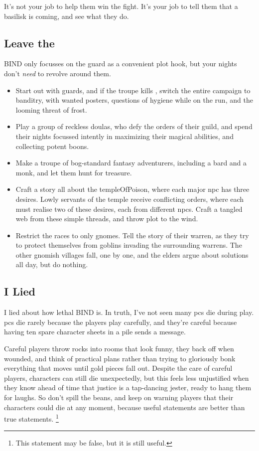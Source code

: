 \begin{multicols}{2}
It's not your job to help them win the fight.
It's your job to tell them that a basilisk is coming, and see what they do.

\subsection{Leave the }
BIND only focusses on the \gls{guard} as a convenient plot hook, but your nights don't \emph{need} to revolve around them.

\begin{itemize}
  \item
  Start out with \glspl{guard}, and if the troupe kills , switch the entire \gls{campaign} to banditry, with wanted posters, questions of hygiene while on the run, and the looming threat of frost.
  \item
  Play a group of reckless \glspl{doula}, who defy the orders of their guild, and spend their nights focussed intently in maximizing their magical abilities, and collecting potent \glspl{boon}.
  \item
  Make a troupe of bog-standard fantasy adventurers, including a bard and a monk, and let them hunt for treasure.
  \item
  Craft a story all about the \gls{templeOfPoison}, where each major \gls{npc} has three desires.
  Lowly servants of the temple receive conflicting orders, where each must realise two of these desires, each from different \glspl{npc}.
  Craft a tangled web from these simple threads, and throw plot to the wind.
  \item
  Restrict the races to only gnomes.
  Tell the story of their warren, as they try to protect themselves from goblins invading the surrounding warrens.
  The other gnomish villages fall, one by one, and the elders argue about solutions all day, but do nothing.
\end{itemize}

\subsection{I Lied}
I lied about how lethal BIND is.
In truth, I've not seen many \glspl{pc} die during play.
\Glspl{pc} die rarely because the players play carefully, and they're careful because having ten spare character sheets in a pile sends a message.

Careful players throw rocks into rooms that look funny, they back off when wounded, and think of practical plans rather than trying to gloriously bonk everything that moves until gold pieces fall out.
Despite the care of careful players, characters can still die unexpectedly, but this feels less unjustified when they know ahead of time that justice is a tap-dancing jester, ready to hang them for laughs.
So don't spill the beans, and keep on warning players that their characters could die at any moment, because useful statements are better than true statements.%
\footnote{This statement may be false, but it is still useful.}


\end{multicols}
